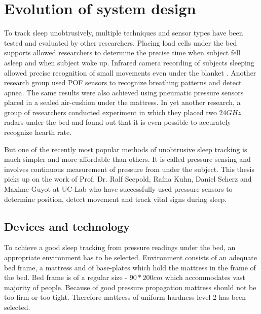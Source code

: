 \chapter{Evolution of system design}
\label{chap:evolution}

To track sleep unobtrusively, multiple techniques and sensor types have been tested and evaluated by other researchers. Placing load cells under the bed supports allowed researchers to determine the precise time when subject fell asleep and when subject woke up\cite{load_cells}. Infrared camera recording of subjects sleeping allowed precise recognition of small movements even under the blanket \cite{video}. Another research group used \ac{POF} sensors to recognize breathing patterns and detect apnea\cite{optical}. The same results were also achieved using pneumatic pressure sensors placed in a sealed air-cushion under the mattress\cite{pneumatic}. In yet another research, a group of researchers conducted experiment in which they placed two $24 GHz$ radars under the bed and found out that it is even possible to accurately recognize hearth rate\cite{radar}.

But one of the recently most popular methods of unobtrusive sleep tracking is much simpler and more affordable than others. It is called pressure sensing and involves continuous measurement of pressure from under the subject. This thesis picks up on the work of Prof. Dr. Ralf Seepold, Ra\'ina Kuhn, Daniel Scherz and Maxime Guyot at \ac{UC-Lab}\cite{Kuhn}\cite{Guyot} who have successfully used pressure sensors to determine position, detect movement and track vital signs during sleep.


\section{Devices and technology}

To achieve a good sleep tracking from pressure readings under the bed, an appropriate environment has to be selected. Environment consists of an adequate bed frame, a mattress and of base-plates which hold the mattress in the frame of the bed. Bed frame is of a regular size - $90 * 200cm$ which accommodates vast majority of people. Because of good pressure propagation mattress should not be too firm or too tight. Therefore mattress of uniform hardness level 2 has been selected.

